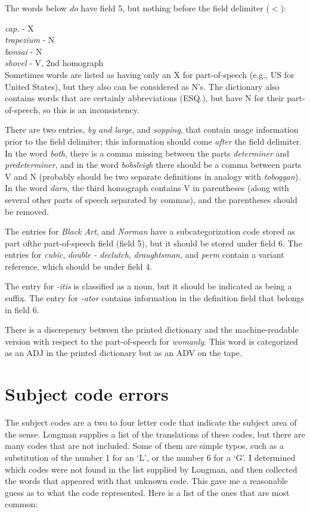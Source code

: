 \bigskip
\noindent
The words below {\em do}  have field 5, but nothing before the field delimiter ($<$):

\medskip
\noindent
{\it cap.}        -  X  \\
{\it trapezium}   -  N \\
{\it bonsai}      -  N \\
{\it shovel}      -  V, 2nd homograph \\



Sometimes words are listed as having only an X for part-of-speech (e.g., US for
United States), but they also can be considered as N's.  The dictionary
also contains words that are certainly abbreviations (ESQ.), but have
N for their part-of-speech, so this is an inconsistency.

There are two entries, {\it by and large}, and {\it sopping}, that contain usage information
prior to the field delimiter;  this information 
 should come {\em after} the field delimiter.  In the word {\it both},  
there is a comma missing between the parts {\it determiner} and {\it predeterminer},
and in the word {\it bobsleigh} there should be a comma between parts V and N
(probably should be two separate definitions in analogy with {\it toboggan}).
In the word {\it darn}, the third homograph contains V in parentheses (along
with several other parts of speech separated by commas), and 
the parentheses should be removed.

The entries for {\it Black Art}, and {\it Norman} have a subcategorization code stored 
as part ofthe part-of-speech field (field 5), but it should be stored under field 6.
The entries for  {\it cubic}, {\it double - declutch}, {\it draughtsman}, and {\it perm}
contain a variant reference, which should be under field 4.

The entry for {\it -itis} is classified as a noun, but it should be indicated as being
a suffix.  The entry for {\it -ator} contains information in the definition field that
belongs in field 6.

There is a discrepency between the printed dictionary and the machine-readable
version with respect to the part-of-speech for 
{\it womanly}.  This word is categorized as an ADJ in the printed dictionary
but as an ADV on the tape.



\section{Subject code errors}
The subject codes are a two to four letter code that indicate the subject area
of the sense.  Longman supplies a list of the translations of these codes, but
there are many codes that are not included.   Some of them are simple typos, such
as a substitution of the number 1 for an `L', or the number 6 for a `G'.  I determined
which codes were not found in the list supplied by Longman, and then collected the
words that appeared with that unknown code.  This gave me a reasonable guess as to
what the code represented.  Here is a list of the ones that are most common:

